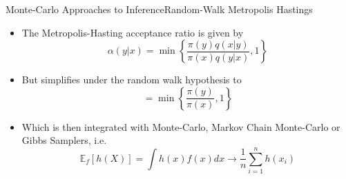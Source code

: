\documentclass[AERbeamer%
              ,optEnglish%
              ,optBiber%
              ,optBibstyleAlphabetic%
              ,optBeamerClassicFormat%
              ]{AERlatex}%
\begin{document}
\begin{frame}[c]{Monte-Carlo Approaches to Inference}{Random-Walk Metropolis Hastings}
    \centering
    \begin{itemize}
        \item The Metropolis-Hasting acceptance ratio is given by
        \begin{equation*}
            \alpha (y | x) = \min \left\{ \frac{\pi(y) q(x|y)}{\pi(x)q(y|x)}, 1 \right\}
        \end{equation*}
        \item But simplifies under the random walk hypothesis to
        \begin{equation*}
            = \min \left\{ \frac{\pi(y)}{\pi(x)}, 1 \right\}
        \end{equation*}
        \item Which is then integrated with Monte-Carlo, Markov Chain Monte-Carlo or Gibbs Samplers, i.e.
        \begin{equation*}
            \mathbb{E}_{f}[h(X)] = \int h(x) f(x) dx \longrightarrow \frac{1}{n} \sum^{n}_{i=1} h(x_{i})
        \end{equation*}
    \end{itemize}
\end{frame}
\end{document}
